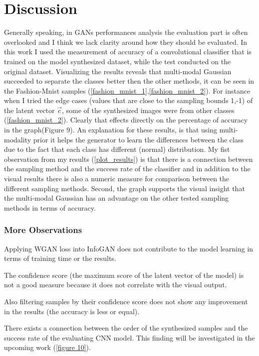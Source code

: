 \documentclass[letterpaper,12pt]{article}
\begin{document}
\section{Discussion}
Generally speaking, in GANs performances analysis the evaluation part is often overlooked and I think we lack clarity around how they should be evaluated.
In this work I used the measurement of accuracy of a convolutional classifier that is trained on the model synthesized dataset, while the test conducted on the original dataset. Visualizing the results reveals that multi-modal Gaussian succeeded to  separate the classes better then the other methods, it can be seen in the Fashion-Mnist samples (\ref{fashion_mnist_1},\ref{fashion_mnist_2}). For instance when I tried the edge cases (values that are close to the sampling bounds 1,-1) of the latent vector $\vec{c}$, some of the synthesized images were from other classes (\ref{fashion_mnist_2}). Clearly that effects directly on the percentage of accuracy in the graph(Figure 9).
An explanation for these results, is that using multi-modality  prior it helps the generator to learn the differences between the class due to the fact that each class has different (normal) distribution.
\newline
My fist observation from my results (\ref{plot_results}) is that there is a connection between the sampling method and the success rate of the classifier and in addition to the visual results there is also a numeric measure for comparison between the different sampling methods. Second, the graph supports the visual insight that the multi-modal Gaussian has an advantage on the other tested sampling methods in terms of accuracy.




\subsubsection*{More Observations}
\begin{enumerate*}[font={\color{red!50!black}\bfseries}]

 \item Applying WGAN loss into InfoGAN does not contribute to the model learning in terms of training time or  the results.\newline
\item The confidence score (the maximum score of the latent vector of the model) is not a good measure because it does not correlate with the visual output.\newline

\item Also filtering samples by their confidence score does not show any improvement in the results (the accuracy is less or equal).\newline

\item There exists a connection between the order of the synthesized samples and the success rate of the evaluating CNN model. This finding will be investigated in the upcoming work (\ref{figure 10}). 

\newline\end{enumerate*}
\end{document}
